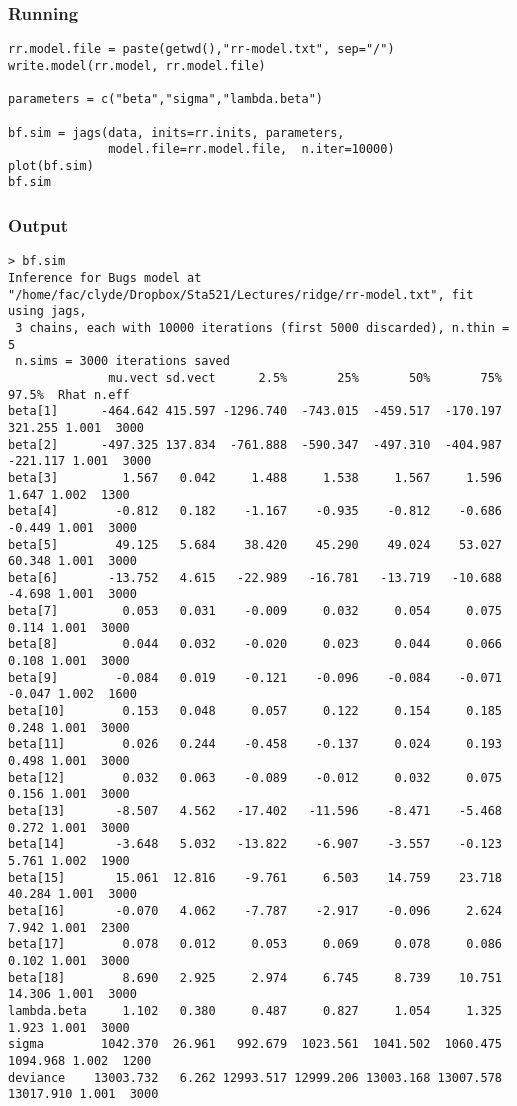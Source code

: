 \documentclass[]{beamer}
\begin{document}
\begin{frame}[fragile]
  \frametitle{Running}
\begin{verbatim}
rr.model.file = paste(getwd(),"rr-model.txt", sep="/")
write.model(rr.model, rr.model.file)

parameters = c("beta","sigma","lambda.beta")

bf.sim = jags(data, inits=rr.inits, parameters, 
              model.file=rr.model.file,  n.iter=10000)
plot(bf.sim)
bf.sim
\end{verbatim}
\end{frame}

\begin{frame}[fragile]
  \frametitle{Output}
  \begin{tiny}
\begin{verbatim}
> bf.sim
Inference for Bugs model at "/home/fac/clyde/Dropbox/Sta521/Lectures/ridge/rr-model.txt", fit using jags,
 3 chains, each with 10000 iterations (first 5000 discarded), n.thin = 5
 n.sims = 3000 iterations saved
              mu.vect sd.vect      2.5%       25%       50%       75%     97.5%  Rhat n.eff
beta[1]      -464.642 415.597 -1296.740  -743.015  -459.517  -170.197   321.255 1.001  3000
beta[2]      -497.325 137.834  -761.888  -590.347  -497.310  -404.987  -221.117 1.001  3000
beta[3]         1.567   0.042     1.488     1.538     1.567     1.596     1.647 1.002  1300
beta[4]        -0.812   0.182    -1.167    -0.935    -0.812    -0.686    -0.449 1.001  3000
beta[5]        49.125   5.684    38.420    45.290    49.024    53.027    60.348 1.001  3000
beta[6]       -13.752   4.615   -22.989   -16.781   -13.719   -10.688    -4.698 1.001  3000
beta[7]         0.053   0.031    -0.009     0.032     0.054     0.075     0.114 1.001  3000
beta[8]         0.044   0.032    -0.020     0.023     0.044     0.066     0.108 1.001  3000
beta[9]        -0.084   0.019    -0.121    -0.096    -0.084    -0.071    -0.047 1.002  1600
beta[10]        0.153   0.048     0.057     0.122     0.154     0.185     0.248 1.001  3000
beta[11]        0.026   0.244    -0.458    -0.137     0.024     0.193     0.498 1.001  3000
beta[12]        0.032   0.063    -0.089    -0.012     0.032     0.075     0.156 1.001  3000
beta[13]       -8.507   4.562   -17.402   -11.596    -8.471    -5.468     0.272 1.001  3000
beta[14]       -3.648   5.032   -13.822    -6.907    -3.557    -0.123     5.761 1.002  1900
beta[15]       15.061  12.816    -9.761     6.503    14.759    23.718    40.284 1.001  3000
beta[16]       -0.070   4.062    -7.787    -2.917    -0.096     2.624     7.942 1.001  2300
beta[17]        0.078   0.012     0.053     0.069     0.078     0.086     0.102 1.001  3000
beta[18]        8.690   2.925     2.974     6.745     8.739    10.751    14.306 1.001  3000
lambda.beta     1.102   0.380     0.487     0.827     1.054     1.325     1.923 1.001  3000
sigma        1042.370  26.961   992.679  1023.561  1041.502  1060.475  1094.968 1.002  1200
deviance    13003.732   6.262 12993.517 12999.206 13003.168 13007.578 13017.910 1.001  3000
\end{verbatim}
    
  \end{tiny}

\end{frame}
\end{document}
